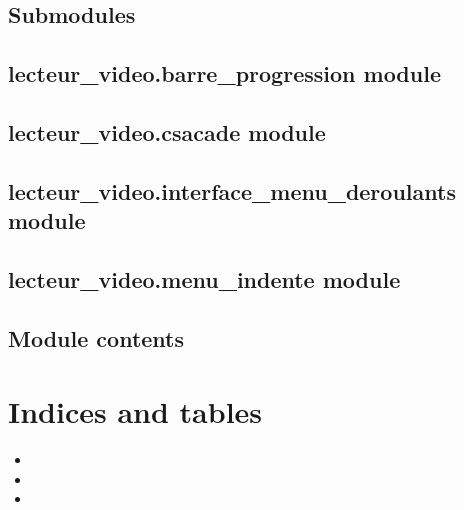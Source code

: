 \documentclass[letterpaper,10pt,english]{sphinxmanual}
\begin{document}
\section{Submodules}
\label{\detokenize{lecteur_video:submodules}}

\section{lecteur\_video.barre\_progression module}
\label{\detokenize{lecteur_video:lecteur-video-barre-progression-module}}

\section{lecteur\_video.csacade module}
\label{\detokenize{lecteur_video:lecteur-video-csacade-module}}

\section{lecteur\_video.interface\_menu\_deroulants module}
\label{\detokenize{lecteur_video:lecteur-video-interface-menu-deroulants-module}}

\section{lecteur\_video.menu\_indente module}
\label{\detokenize{lecteur_video:lecteur-video-menu-indente-module}}

\section{Module contents}
\label{\detokenize{lecteur_video:module-lecteur_video}}\label{\detokenize{lecteur_video:module-contents}}

\chapter{Indices and tables}
\label{\detokenize{index:indices-and-tables}}\begin{itemize}
\item {} 
\sphinxAtStartPar
{}

\item {} 
\sphinxAtStartPar
{}

\item {} 
\sphinxAtStartPar
{}

\end{itemize}
\end{document}
